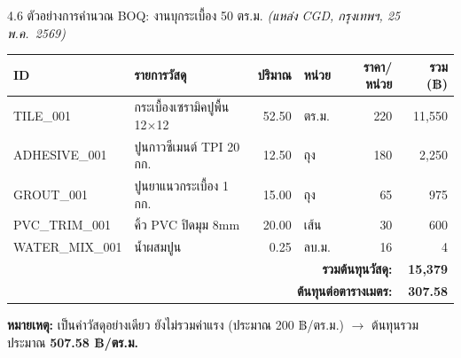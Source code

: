 \documentclass[aspectratio=169,11pt]{beamer}
\begin{document}
\begin{frame}{4.6 ตัวอย่างการคำนวณ BOQ: งานบุกระเบื้อง 50 ตร.ม.}
  \footnotesize
  \textit{(แหล่ง CGD, กรุงเทพฯ, 25 พ.ค.~2569)}
  \begin{table}
    \centering
    \scriptsize
    \begin{tabularx}{\textwidth}{l X r l r r}
      \toprule
      \textbf{ID} & \textbf{รายการวัสดุ} & \textbf{ปริมาณ} & \textbf{หน่วย} & \textbf{ราคา/หน่วย} & \textbf{รวม (฿)} \\
      \midrule
      TILE\_001       & กระเบื้องเซรามิคปูพื้น 12$\times$12  & 52.50 & ตร.ม.   & 220 & 11{,}550 \\
      ADHESIVE\_001   & ปูนกาวซีเมนต์ TPI 20 กก.            & 12.50 & ถุง     & 180 &  2{,}250 \\
      GROUT\_001      & ปูนยาแนวกระเบื้อง 1 กก.              & 15.00 & ถุง     &  65 &     975 \\
      PVC\_TRIM\_001  & คิ้ว PVC ปิดมุม 8mm                  & 20.00 & เส้น    &  30 &     600 \\
      WATER\_MIX\_001 & น้ำผสมปูน                           &  0.25 & ลบ.ม.  &  16 &       4 \\
      \midrule
      \multicolumn{5}{r}{\textbf{รวมต้นทุนวัสดุ:}}                       & \textbf{15{,}379} \\
      \multicolumn{5}{r}{\textbf{ต้นทุนต่อตารางเมตร:}}                  & \textbf{307.58} \\
      \bottomrule
    \end{tabularx}
  \end{table}
  \vspace{0.3em}
  \footnotesize\textbf{หมายเหตุ:} เป็นค่าวัสดุอย่างเดียว ยังไม่รวมค่าแรง
  (ประมาณ 200 ฿/ตร.ม.) $\to$ ต้นทุนรวมประมาณ \textbf{507.58 ฿/ตร.ม.}
\end{frame}
\end{document}
